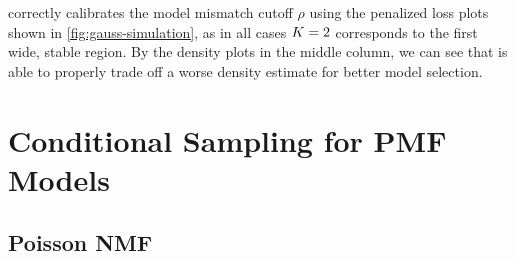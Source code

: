 \methodname correctly calibrates the model mismatch cutoff $\rho$ using the penalized loss plots shown in \cref{fig:gauss-simulation},
as in all cases $K = 2$ corresponds to the first wide, stable region.
By the density plots in the middle column, we can see that \methodname 
is able to properly trade off a worse density estimate for better model selection.





\section{Conditional Sampling for PMF Models}

\subsection{Poisson NMF}

